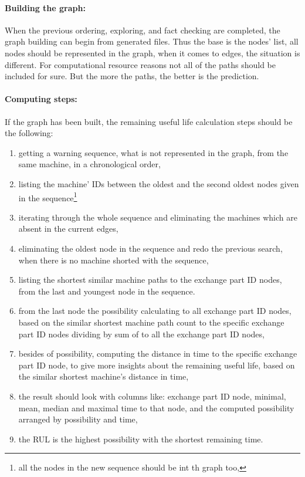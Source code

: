 			\paragraph{Building the graph:}
			When the previous ordering, exploring, and fact checking are completed, the graph building can begin from generated files. Thus the base is the nodes' list, all nodes should be represented in the graph, when it comes to edges, the situation is different. For computational resource reasons not all of the paths should be included for sure. But the more the paths, the better is the prediction.
\clearpage\paragraph{Computing steps:}
			If the graph has been built, the remaining useful life calculation steps should be the following:
			\begin{enumerate}
				\item{getting a warning sequence, what is not represented in the graph, from the same machine, in a chronological order,}
				\item{listing the machine' IDs between the oldest and the second oldest nodes given in the sequence}\footnote{all the nodes in the new sequence should be int th graph too,} 
				\item{iterating through the whole sequence and eliminating the machines which are absent in the current edges,}
				\item{eliminating the oldest node in the sequence and redo the previous search, when there is no machine shorted with the sequence,}
				\item{listing the shortest similar machine paths to the exchange part ID nodes, from the last and youngest node in the sequence.}
				\item{from the last node the possibility calculating to all exchange part ID nodes, based on the similar shortest machine path count to the specific exchange part ID nodes dividing by sum of to all the exchange part ID nodes,}
				\item{besides of possibility, computing the distance in time  to the specific exchange part ID node, to give more insights about the remaining useful life, based on the similar shortest machine's distance in time,}
				\item{the result should look with columns like: exchange part ID node, minimal, mean, median and maximal time to that node, and the computed possibility arranged by possibility and time,} 
		 		\item{the RUL is the highest possibility with the shortest remaining time.}
		 	\end{enumerate}
		

